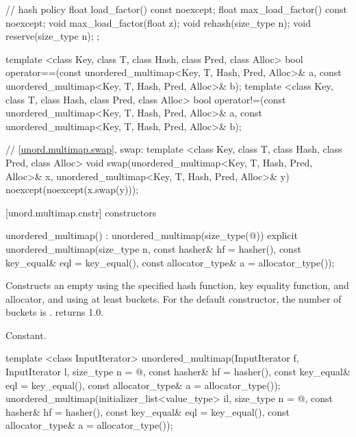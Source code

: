 \begin{codeblock}
{{    // hash policy
    float load_factor() const noexcept;
    float max_load_factor() const noexcept;
    void max_load_factor(float z);
    void rehash(size_type n);
    void reserve(size_type n);
  };

  template <class Key, class T, class Hash, class Pred, class Alloc>
    bool operator==(const unordered_multimap<Key, T, Hash, Pred, Alloc>& a,
                    const unordered_multimap<Key, T, Hash, Pred, Alloc>& b);
  template <class Key, class T, class Hash, class Pred, class Alloc>
    bool operator!=(const unordered_multimap<Key, T, Hash, Pred, Alloc>& a,
                    const unordered_multimap<Key, T, Hash, Pred, Alloc>& b);

  // \ref{unord.multimap.swap}, swap:
  template <class Key, class T, class Hash, class Pred, class Alloc>
    void swap(unordered_multimap<Key, T, Hash, Pred, Alloc>& x,
              unordered_multimap<Key, T, Hash, Pred, Alloc>& y)
      noexcept(noexcept(x.swap(y)));

}
\end{codeblock}

[unord.multimap.cnstr]{ constructors}

%
\begin{itemdecl}
unordered_multimap() : unordered_multimap(size_type(@\seebelow@)) { }
explicit unordered_multimap(size_type n,
                            const hasher& hf = hasher(),
                            const key_equal& eql = key_equal(),
                            const allocator_type& a = allocator_type());
\end{itemdecl}

\begin{itemdescr}
\pnum
\effects Constructs an empty  using the
specified hash function, key equality function, and allocator, and
using at least  buckets.  For the default constructor,
the number of buckets is .
 returns 1.0.

\pnum
\complexity Constant.
\end{itemdescr}

%
\begin{itemdecl}
template <class InputIterator>
  unordered_multimap(InputIterator f, InputIterator l,
                     size_type n = @\seebelow@,
                     const hasher& hf = hasher(),
                     const key_equal& eql = key_equal(),
                     const allocator_type& a = allocator_type());
unordered_multimap(initializer_list<value_type> il,
                   size_type n = @\seebelow@,
                   const hasher& hf = hasher(),
                   const key_equal& eql = key_equal(),
                   const allocator_type& a = allocator_type());
\end{itemdecl}

